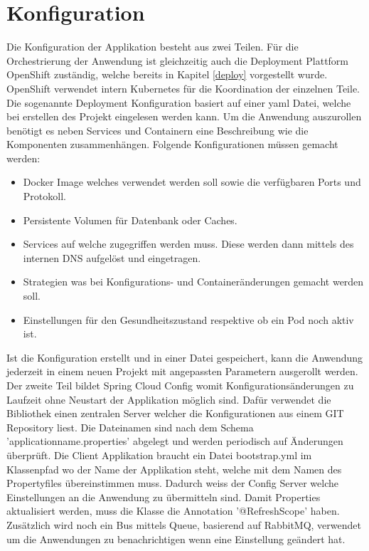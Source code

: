 \section{Konfiguration}
\label{config}

Die Konfiguration der Applikation besteht aus zwei Teilen. Für die Orchestrierung der Anwendung ist gleichzeitig auch die Deployment Plattform OpenShift zuständig, welche bereits in Kapitel \ref{deploy} vorgestellt wurde. OpenShift verwendet intern Kubernetes für die Koordination der einzelnen Teile. Die sogenannte Deployment Konfiguration basiert auf einer yaml Datei, welche bei erstellen des Projekt eingelesen werden kann. 
Um die Anwendung  auszurollen benötigt es neben Services und Containern eine Beschreibung wie die Komponenten zusammenhängen. Folgende Konfigurationen müssen gemacht werden:\newline
\begin{itemize}
	\item Docker Image welches verwendet werden soll sowie die verfügbaren Ports und Protokoll.
	\item Persistente Volumen für Datenbank oder Caches.
	\item Services auf welche zugegriffen werden muss. Diese werden dann mittels des internen DNS aufgelöst und eingetragen.
	\item Strategien was bei Konfigurations- und Containeränderungen gemacht werden soll.
	\item Einstellungen für den Gesundheitszustand respektive ob ein Pod noch aktiv ist.
\end{itemize}

Ist die Konfiguration erstellt und in einer Datei gespeichert, kann die Anwendung jederzeit in einem neuen Projekt mit angepassten Parametern ausgerollt werden.\newline
Der zweite Teil bildet Spring Cloud Config womit Konfigurationsänderungen zu Laufzeit ohne Neustart der Applikation möglich sind. Dafür verwendet die Bibliothek einen zentralen Server welcher die Konfigurationen aus einem GIT Repository liest. Die Dateinamen sind nach dem Schema 'applicationname.properties' abgelegt und werden periodisch auf Änderungen überprüft. Die Client Applikation braucht ein Datei bootstrap.yml im Klassenpfad wo der Name der Applikation steht, welche mit dem Namen des Propertyfiles übereinstimmen muss. Dadurch weiss der Config Server welche Einstellungen an die Anwendung zu übermitteln sind. Damit Properties aktualisiert werden, muss die Klasse die Annotation '@RefreshScope' haben. Zusätzlich wird noch ein Bus mittels Queue, basierend auf RabbitMQ, verwendet um die Anwendungen zu benachrichtigen wenn eine Einstellung geändert hat.

